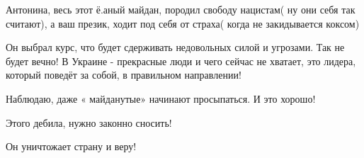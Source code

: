 \begin{itemize}

Антонина, весь этот ё.аный майдан, породил свободу нацистам( ну они себя так
считают), а ваш презик, ходит под себя от страха( когда не закидывается коксом)

Он выбрал курс, что будет сдерживать недовольных силой и угрозами. Так не будет
вечно! В Украине - прекрасные люди и чего сейчас не хватает, это лидера, который
поведёт за собой, в правильном направлении!

Наблюдаю, даже « майданутые» начинают просыпаться. И это хорошо!

Этого дебила, нужно законно сносить!

Он уничтожает страну и веру!

\end{itemize} %
